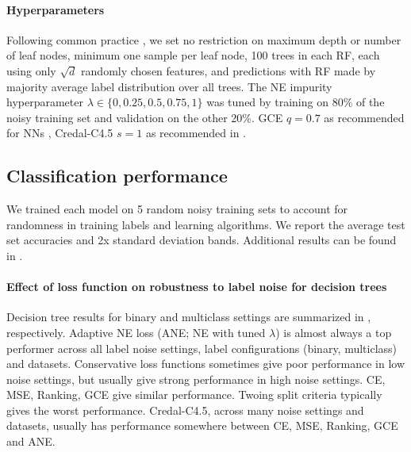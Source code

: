 \documentclass[letterpaper]{article} %
\begin{document}
\paragraph{Hyperparameters}
Following common practice \cite{pedregosa2011scikit}, 
we set no restriction on maximum depth or number of leaf nodes, 
minimum one sample per leaf node,
100 trees in each RF, 
each using only $\sqrt{d}$ randomly chosen features, 
and 
predictions with RF made by majority average label distribution over all trees.
The NE impurity hyperparameter $\lambda\in\{0,0.25,0.5,0.75,1\}$ was tuned by
training on 80\% of the noisy training set and validation on the other 20\%.
GCE $q=0.7$ as recommended for NNs \cite{zhang2018generalized},
Credal-C4.5 $s=1$ as recommended in \cite{mantas2014credal}. 

\subsection{Classification performance}
We trained each model on 5 random noisy training sets to account for randomness in
training labels and learning algorithms.
We report the average test set accuracies and 2x standard deviation bands. 
Additional results can be found in .


\paragraph{Effect of loss function on robustness to label noise for decision trees}
Decision tree results for binary and multiclass settings are summarized in
, respectively.
Adaptive NE loss (ANE; NE with tuned $\lambda$) is almost always a top performer
across all label noise settings, label configurations (binary, multiclass) and
datasets. 
Conservative loss functions sometimes give poor performance in low noise
settings, but usually give strong performance in high noise settings. 
CE, MSE, Ranking, GCE give similar performance. 
Twoing split criteria typically gives the worst performance. 
Credal-C4.5, across many noise settings and datasets, usually has performance
somewhere between CE, MSE, Ranking, GCE and ANE.
\end{document}
